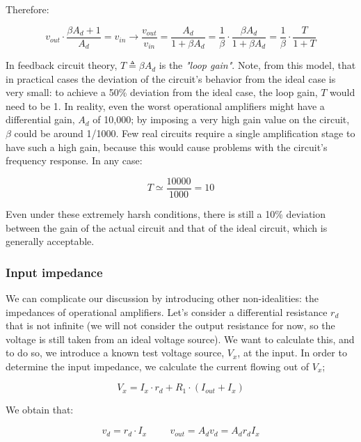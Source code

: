 \documentclass[../main.tex]{subfiles}
\begin{document}
Therefore:

\begin{equation}
	v_{out} \cdot \frac{\beta A_d + 1}{A_d} = v_{in} \rightarrow \frac{v_{out}}{v_{in}} = \frac{A_d}{1 + \beta A_d} = \frac{1}{\beta} \cdot \frac{\beta A_d}{1 + \beta A_d} = \frac{1}{\beta} \cdot \frac{T}{1 + T}
\end{equation}


In feedback circuit theory, $T \triangleq \beta A_d $ is the \textit{"loop gain"}. Note, from this model, that in practical cases the deviation of the circuit’s behavior from the ideal case is very small: to achieve a 50\% deviation from the ideal case, the loop gain, $T$ would need to be 1. In reality, even the worst operational amplifiers might have a differential gain, $A_d$ of 10,000; by imposing a very high gain value on the circuit, $\beta$ could be around 1/1000. Few real circuits require a single amplification stage to have such a high gain, because this would cause problems with the circuit’s frequency response. In any case:

\begin{equation}
	T \simeq \frac{10000}{1000} = 10
\end{equation}

Even under these extremely harsh conditions, there is still a 10\% deviation between the gain of the actual circuit and that of the ideal circuit, which is generally acceptable.

\subsubsection*{Input impedance}

We can complicate our discussion by introducing other non-idealities: the impedances of operational amplifiers. Let’s consider a differential resistance $r_d$ that is not infinite (we will not consider the output resistance for now, so the voltage is still taken from an ideal voltage source). We want to calculate this, and to do so, we introduce a known test voltage source, $V_x$, at the input. In order to determine the input impedance, we calculate the current flowing out of $V_x$;

\begin{equation}
	V_x = I_x \cdot r_d + R_1 \cdot (I_{out} + I_x)
\end{equation}

We obtain that:

\begin{equation}
	v_d = r_d \cdot I_x \hspace{1cm} v_{out} = A_dv_d = A_dr_dI_x
\end{equation}
\end{document}
